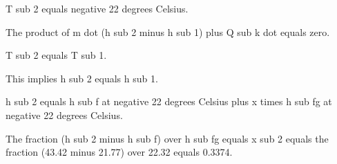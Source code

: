 T sub 2 equals negative 22 degrees Celsius.

The product of m dot (h sub 2 minus h sub 1) plus Q sub k dot equals zero.

T sub 2 equals T sub 1.

This implies h sub 2 equals h sub 1.

h sub 2 equals h sub f at negative 22 degrees Celsius plus x times h sub fg at negative 22 degrees Celsius.

The fraction (h sub 2 minus h sub f) over h sub fg equals x sub 2 equals the fraction (43.42 minus 21.77) over 22.32 equals 0.3374.